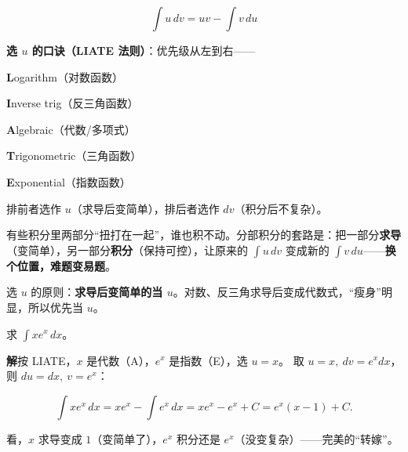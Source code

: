 \documentclass[11pt,a4paper]{article}
\newcommand{\keyw}[1]{\colorbox{cYellowL}{\textbf{\color{cOrange}#1}}}
\begin{document}
\begin{tipbox}
\begin{eqbox}\[ \int u\,dv=uv-\int v\,du \]\end{eqbox}
\textbf{选 $u$ 的口诀（LIATE 法则）}：优先级从左到右——
\begin{orngdot}
  \item \textbf{L}ogarithm（对数函数）
  \item \textbf{I}nverse trig（反三角函数）
  \item \textbf{A}lgebraic（代数/多项式）
  \item \textbf{T}rigonometric（三角函数）
  \item \textbf{E}xponential（指数函数）
\end{orngdot}
排前者选作 $u$（求导后变简单），排后者选作 $dv$（积分后不复杂）。
\end{tipbox}

\begin{plainbox}[白话解读：分部积分 = “转嫁矛盾”]
有些积分里两部分“扭打在一起”，谁也积不动。分部积分的套路是：把一部分\textbf{求导}（变简单），另一部分\textbf{积分}（保持可控），让原来的 $\int u\,dv$ 变成新的 $\int v\,du$——\keyw{换个位置，难题变易题}。

选 $u$ 的原则：\textbf{求导后变简单的当 $u$}。对数、反三角求导后变成代数式，“瘦身”明显，所以优先当 $u$。
\end{plainbox}

\begin{egbox}[分部积分]
求 $\displaystyle\int x e^x\,dx$。

\textbf{解}\quad 按 LIATE，$x$ 是代数（A），$e^x$ 是指数（E），选 $u=x$。
取 $u=x,\ dv=e^x dx$，则 $du=dx,\ v=e^x$：
\begin{eqbox}\[ \int x e^x\,dx = xe^x-\int e^x\,dx = xe^x-e^x+C=\boxed{e^x(x-1)+C}. \]\end{eqbox}
看，$x$ 求导变成 $1$（变简单了），$e^x$ 积分还是 $e^x$（没变复杂）——完美的“转嫁”。
\end{egbox}
\end{document}

